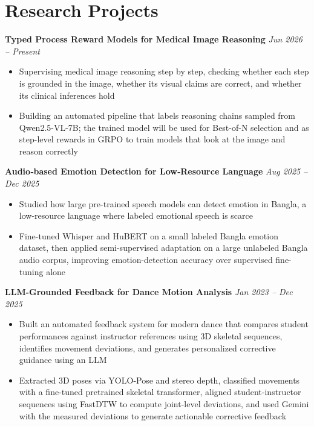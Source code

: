 \documentclass[10pt,letterpaper]{article}
\newcommand{\headingsimple}[2]{%
  \noindent\textbf{#1} \hfill #2\par
}
\begin{document}
\section{Research Projects}

\headingsimple{Typed Process Reward Models for Medical Image Reasoning}{\textit{Jun 2026 -- Present}}
\begin{itemize}
  \item Supervising medical image reasoning step by step, checking whether each step is grounded in the image, whether its visual claims are correct, and whether its clinical inferences hold
  \item Building an automated pipeline that labels reasoning chains sampled from Qwen2.5-VL-7B; the trained model will be used for Best-of-N selection and as step-level rewards in GRPO to train models that look at the image and reason correctly
\end{itemize}

\headingsimple{Audio‑based Emotion Detection for Low‑Resource Language}{\textit{Aug 2025 -- Dec 2025}}
\begin{itemize}
  \item Studied how large pre-trained speech models can detect emotion in Bangla, a low-resource language where labeled emotional speech is scarce
  \item Fine-tuned Whisper and HuBERT on a small labeled Bangla emotion dataset, then applied semi-supervised adaptation on a large unlabeled Bangla audio corpus, improving emotion-detection accuracy over supervised fine-tuning alone
\end{itemize}


\headingsimple{LLM-Grounded Feedback for Dance Motion Analysis}{\textit{Jan 2023 -- Dec 2025}}
\begin{itemize}
  \item Built an automated feedback system for modern dance that compares student performances against instructor references using 3D skeletal sequences, identifies movement deviations, and generates personalized corrective guidance using an LLM
  \item Extracted 3D poses via YOLO-Pose and stereo depth, classified movements with a fine-tuned pretrained skeletal transformer, aligned student-instructor sequences using FastDTW to compute joint-level deviations, and used Gemini with the measured deviations to generate actionable corrective feedback
\end{itemize}
\end{document}
